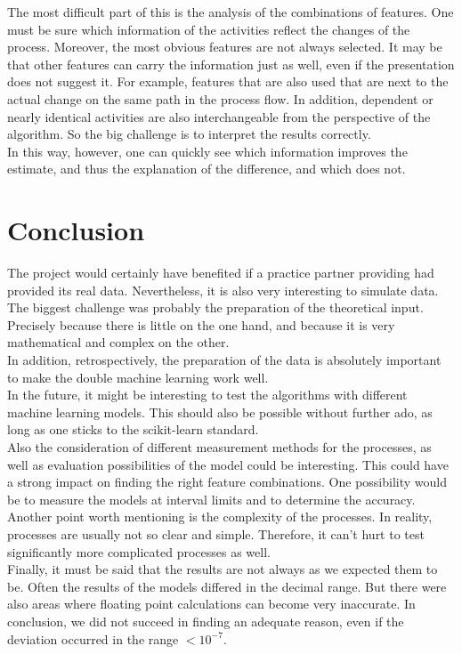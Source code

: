     The most difficult part of this is the analysis of the combinations of features. One must be sure which information of the activities reflect the changes of the process. Moreover, the most obvious features are not always selected. It may be that other features can carry the information just as well, even if the presentation does not suggest it. For example, features that are also used that are next to the actual change on the same path in the process flow. In addition, dependent or nearly identical activities are also interchangeable from the perspective of the algorithm. So the big challenge is to interpret the results correctly.\\
    In this way, however, one can quickly see which information improves the estimate, and thus the explanation of the difference, and which does not.

\clearpage
\chapter{Conclusion}
The project would certainly have benefited if a practice partner providing had provided its real data. Nevertheless, it is also very interesting to simulate data.\\
The biggest challenge was probably the preparation of the theoretical input. Precisely because there is little on the one hand, and because it is very mathematical and complex on the other.\\
In addition, retrospectively, the preparation of the data is absolutely important to make the double machine learning work well.\\
In the future, it might be interesting to test the algorithms with different machine learning models. This should also be possible without further ado, as long as one sticks to the scikit-learn standard.\\
Also the consideration of different measurement methods for the processes, as well as evaluation possibilities of the model could be interesting. This could have a strong impact on finding the right feature combinations. One possibility would be to measure the models at interval limits and to determine the accuracy.\\
Another point worth mentioning is the complexity of the processes. In reality, processes are usually not so clear and simple. Therefore, it can't hurt to test significantly more complicated processes as well.\\
Finally, it must be said that the results are not always as we expected them to be. Often the results of the models differed in the decimal range. But there were also areas where floating point calculations can become very inaccurate. In conclusion, we did not succeed in finding an adequate reason, even if the deviation occurred in the range $<10^{-7}$.
\clearpage